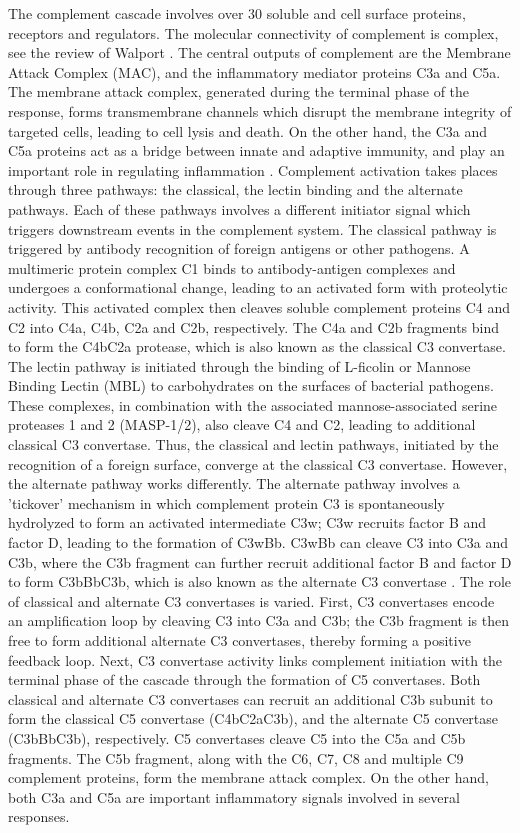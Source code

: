 \documentclass[12pt]{article}
\begin{document}
The complement cascade involves over 30 soluble and cell surface proteins, receptors and regulators.
The molecular connectivity of complement is complex, see the review of Walport \cite{Walport:2001ab,Walport:2001aa}.
The central outputs of complement are the Membrane Attack Complex (MAC), and the inflammatory mediator proteins C3a and C5a.
The membrane attack complex, generated during the terminal phase of the response,
forms transmembrane channels which disrupt the membrane integrity of targeted cells, leading to cell lysis and death.
On the other hand, the C3a and C5a proteins act as a bridge between innate and adaptive immunity, and play an important role in regulating inflammation \cite{sarma2011complement}.
Complement activation takes places through three pathways: the classical, the lectin binding and the alternate pathways.
Each of these pathways involves a different initiator signal which triggers downstream events in the complement system.
The classical pathway is triggered by antibody recognition of foreign antigens or other pathogens.
A multimeric protein complex C1 binds to antibody-antigen complexes and undergoes a conformational change, leading to an activated form with proteolytic activity.
This activated complex then cleaves soluble complement proteins C4 and C2 into C4a, C4b, C2a and C2b, respectively.
The C4a and C2b fragments bind to form the C4bC2a protease, which is also known as the classical C3 convertase.
The lectin pathway is initiated through the binding of L-ficolin or Mannose Binding Lectin (MBL) to carbohydrates on the surfaces of bacterial pathogens.
These complexes, in combination with the associated mannose-associated serine proteases
1 and 2 (MASP-1/2), also cleave C4 and C2, leading to additional classical C3 convertase.
Thus, the classical and lectin pathways, initiated by the recognition of a foreign surface,  converge at the classical C3 convertase.
However, the alternate pathway works differently.
The alternate pathway involves a 'tickover' mechanism in which complement protein C3 is spontaneously hydrolyzed to form an activated intermediate C3w;
C3w recruits factor B and factor D, leading to the formation of C3wBb. C3wBb can cleave C3 into C3a and C3b, where
the C3b fragment can further recruit additional factor B and factor D to form C3bBbC3b, which is also known as the alternate C3 convertase \cite{pangburn1984alternative}.
The role of classical and alternate C3 convertases is varied.
First, C3 convertases encode an amplification loop by cleaving C3 into C3a and C3b; the C3b fragment is then free to form additional alternate C3 convertases,
thereby forming a positive feedback loop.
Next, C3 convertase activity links complement initiation with the terminal phase of the cascade through the formation of C5 convertases.
Both classical and alternate C3 convertases can recruit an additional C3b subunit to form the classical C5 convertase (C4bC2aC3b), and the alternate C5 convertase (C3bBbC3b), respectively.
C5 convertases cleave C5 into the C5a and C5b fragments.
The C5b fragment, along with the C6, C7, C8 and multiple C9 complement proteins, form the membrane attack complex.
On the other hand, both C3a and C5a are important inflammatory signals involved in several responses.
\end{document}
